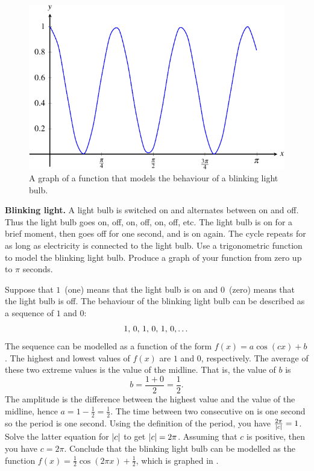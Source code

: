 \documentclass[a4paper,oneside,12pt]{article}
\begin{document}
\begin{figure}[!htbp]
\centering
\includegraphics[scale=1.1]{image/13/blinking-light.pdf}
\caption{%
  A graph of a function that models the behaviour of a blinking light
  bulb.
}
\label{fig:trigonometric:blinking_light}
\end{figure}

\begin{example}
\textbf{Blinking light.}
A light bulb is switched on and alternates between on and off.  Thus
the light bulb goes on, off, on, off, on, off, etc.  The light bulb is
on for a brief moment, then goes off for one second, and is on again.
The cycle repeats for as long as electricity is connected to the light
bulb.  Use a trigonometric function to model the blinking light bulb.
Produce a graph of your function from zero up to $\pi$ seconds.
\end{example}

\begin{solution}
Suppose that $1$~(one) means that the light bulb is on and $0$~(zero)
means that the light bulb is off.  The behaviour of the blinking light
bulb can be described as a sequence of $1$ and $0$:
\[
{{1},\, {0}},\, {{1},\, {0}},\, {{1},\, {0}},\dots
\]
The sequence can be modelled as a function of the form
$f(x) = a \cos(cx) + b$.  The highest and lowest values of $f(x)$ are
$1$ and $0$, respectively.  The average of these two extreme values is
the value of the midline.  That is, the value of $b$ is
\[
b
=
\frac{1 + 0}{2}
=
\frac{1}{2}.
\]
The amplitude is the difference between the highest value and the
value of the midline, hence
$a = 1 - \frac{1}{2} = \frac{1}{2}$.  The time between two consecutive
on is one second so the period is one second.  Using the definition of
the period, you have
$\frac{2\pi}{\lvert c\rvert} = 1$.  Solve the latter equation for
$\lvert c\rvert$ to get $\lvert c\rvert = 2\pi$.  Assuming that
$c$ is positive, then you have $c = 2\pi$.  Conclude that the blinking
light bulb can be modelled as the function
$f(x) = \frac{1}{2} \cos(2\pi x) + \frac{1}{2}$, which is graphed in
.
\end{solution}
\end{document}
